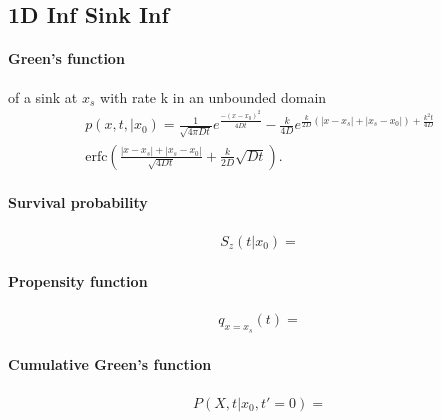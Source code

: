 
\subsection{1D Inf Sink Inf}

\paragraph{Green's function} of a sink at $x_s$ with rate k in an unbounded domain
\begin{multline}
 p(x,t,|x_0) = \frac{1}{\sqrt{4 \pi D t}}e^{\frac{-(x-x_0)^2}{4 D t}} - \frac{k}{4 D}e^{\frac{k}{2 D}(|x-x_s|+|x_s-x_0|)+\frac{k^2 t}{4 D}} \\
\mathrm{erfc}\left( \frac{|x-x_s|+|x_s-x_0|}{\sqrt{4 D t}}+\frac{k}{2D}\sqrt{D t} \right).
\end{multline}

\paragraph{Survival probability}
\begin{align}
  S_z(t|x_0) = 
\end{align}

\paragraph{Propensity function}
\begin{align}
  q_{x=x_s}(t) =   
\end{align}

\paragraph{Cumulative Green's function}
\begin{align}
  P(X,t|x_0,t'=0) = 
\end{align}